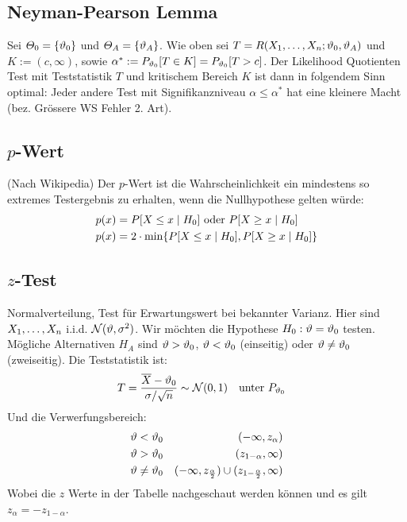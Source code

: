 \subsection*{Neyman-Pearson Lemma}
Sei $\varTheta_0 = \{\vartheta_0\}$ und $\varTheta_A = \{\vartheta_A\}$. Wie oben sei $T =
  R (X_1, \dots, X_n; \vartheta_0, \vartheta_A)$ und $K := (c, \infty)$, sowie $\alpha^* :=
  P_{\vartheta_0}[T \in K] = P_{\vartheta_0}[T > c]$. Der Likelihood Quotienten Test mit
Teststatistik $T$ und kritischem Bereich $K$ ist dann in folgendem Sinn
optimal: Jeder andere Test mit Signifikanzniveau $\alpha \leq \alpha^*$ hat
eine kleinere Macht (bez. Grössere WS Fehler 2. Art).
\subsection*{$p$-Wert}
(Nach Wikipedia) Der $p$-Wert ist die Wahrscheinlichkeit ein mindestens
so extremes Testergebnis zu erhalten, wenn die Nullhypothese gelten würde:
\begin{align*}
  p (x) & = P[X \leq x \; | \; H_0] \text{   oder   } P[X \geq x \; | \; H_0]   \\
  p (x) & = 2 \cdot \min \{ P[X \leq x \; | \; H_0], P[X \geq x \; | \; H_0] \}
\end{align*}
\subsection*{$z$-Test}
Normalverteilung, Test für Erwartungswert bei bekannter Varianz. Hier sind
$X_1, \dots, X_n$ i.i.d. $\mathcal{N} (\vartheta, \sigma^2)$. Wir möchten die
Hypothese $H_0 : \vartheta = \vartheta_0$ testen. Mögliche Alternativen $H_A$ sind $\vartheta >
  \vartheta_0$, $\vartheta < \vartheta_0$ (einseitig) oder $\vartheta \neq \vartheta_0$ (zweiseitig). Die
Teststatistik ist:
\begin{align*}
  T & = \frac{\overline{X} - \vartheta_0}{\sigma / \sqrt{n}} \sim \mathcal{N} (0, 1)
    &                                                                               & \text{unter } P_{\vartheta_0}
\end{align*}
Und die Verwerfungsbereich:
\begin{align*}
  \vartheta < \vartheta_0    &  & (-\infty, z_\alpha)                                                      \\
  \vartheta > \vartheta_0    &  & (z_{1 - \alpha}, \infty)                                                 \\
  \vartheta \neq \vartheta_0 &  & (-\infty, z_{\frac{\alpha}{2}}) \cup  (z_{1 - \frac{\alpha}{2}}, \infty)
\end{align*}
Wobei die $z$ Werte in der Tabelle nachgeschaut werden können
und es gilt $z_\alpha = - z_{1 - \alpha}$.

